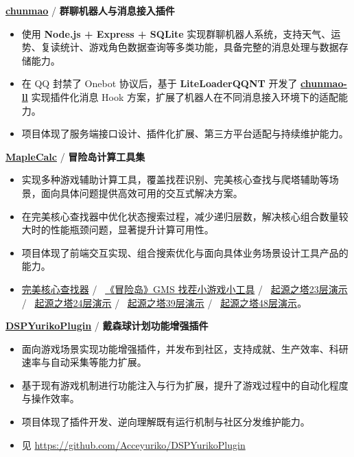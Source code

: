 \par \textbf{\href{https://github.com/Acceyuriko/chunmao}{chunmao}} / \textbf{群聊机器人与消息接入插件}
\begin{itemize}
  \item 使用 \textbf{Node.js + Express + SQLite} 实现群聊机器人系统，支持天气、运势、复读统计、游戏角色数据查询等多类功能，具备完整的消息处理与数据存储能力。
  \item 在 QQ 封禁了 Onebot 协议后，基于 \textbf{LiteLoaderQQNT} 开发了 \textbf{\href{https://github.com/Acceyuriko/chunmao-ll}{chunmao-ll}} 实现插件化消息 Hook 方案，扩展了机器人在不同消息接入环境下的适配能力。
  \item 项目体现了服务端接口设计、插件化扩展、第三方平台适配与持续维护能力。
\end{itemize}

\par \textbf{\href{https://github.com/Acceyuriko/MapleCalc}{MapleCalc}} / \textbf{冒险岛计算工具集}
\begin{itemize}
  \item 实现多种游戏辅助计算工具，覆盖找茬识别、完美核心查找与爬塔辅助等场景，面向具体问题提供高效可用的交互式解决方案。
  \item 在完美核心查找器中优化状态搜索过程，减少递归层数，解决核心组合数量较大时的性能瓶颈问题，显著提升计算可用性。
  \item 项目体现了前端交互实现、组合搜索优化与面向具体业务场景设计工具产品的能力。
  \item \href{https://acceyuriko.github.io/MapleCalc/#/home}{完美核心查找器} / \
    \href{https://www.bilibili.com/video/BV1WG411u7tm/?vd_source=cdd00c562938e991f6e38794d2a99c6b}{《冒险岛》GMS 找茬小游戏小工具} / \
    \href{https://www.bilibili.com/video/BV1d24y1c7hM/}{起源之塔23层演示} / \
    \href{https://www.bilibili.com/video/BV16j411c72c/}{起源之塔24层演示} / \
    \href{https://www.bilibili.com/video/BV1ka4y1T7gF/}{起源之塔39层演示} / \
    \href{https://www.bilibili.com/video/BV1ko4y1w7gZ/}{起源之塔48层演示}。
\end{itemize}

\par \textbf{\href{https://dsp.thunderstore.io/package/Acceyuriko/EnableAchievements/}{DSPYurikoPlugin}} / \textbf{戴森球计划功能增强插件}
\begin{itemize}
  \item 面向游戏场景实现功能增强插件，并发布到社区，支持成就、生产效率、科研速率与自动采集等能力扩展。
  \item 基于现有游戏机制进行功能注入与行为扩展，提升了游戏过程中的自动化程度与操作效率。
  \item 项目体现了插件开发、逆向理解既有运行机制与社区分发维护能力。
  \item 见 \href{https://github.com/Acceyuriko/DSPYurikoPlugin}{https://github.com/Acceyuriko/DSPYurikoPlugin}
\end{itemize}

